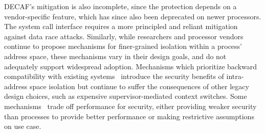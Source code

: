 DECAF's mitigation is also incomplete, since the protection depends on
a vendor-specific feature, which has since also been deprecated on newer
processors.
The system call interface requires a more principled and reliant
mitigation against data race attacks.
Similarly, while researchers and processor vendors continue to propose 
mechanisms for finer-grained isolation within a process' address space, 
these mechanisms vary in their design goals, and do not adequately
support widespread adoption.
Mechanisms which prioritize backward compatibility with existing 
systems~\cite{LittonVE0BD16, HsuHEP16, HedayatiGJCSSM19Hodor, LeeSK18, DuHXZC19XPC}
introduce the security benefits of intra-address space isolation
but continue to suffer the consequences of other legacy design choices, 
such as expensive supervisor-mediated context switches.
Some mechanisms~\cite{ParkLXMK19, HedayatiGJCSSM19Hodor} trade off 
performance for security, either providing weaker security than processes
to provide better performance or making restrictive assumptions on
use case.


